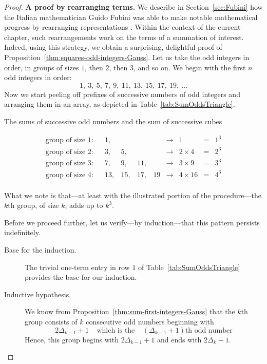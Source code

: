 \begin{proof}
{\bf A proof by rearranging terms.}
%
We describe in Section~\ref{sec:Fubini} how the Italian mathematician
Guido Fubini
%
was able to make notable mathematical progress by rearranging
representations \cite{Fubini}.  Within the context of the current
chapter, such rearrangements work on the terms of a summation of
interest.  Indeed, using this strategy, we obtain a surprising,
delightful proof of Proposition~\ref{thm:squares-odd-integers-Gauss}.
Let us take the odd integers in order, in groups of sizes $1$, then
$2$, then $3$, and so on.  We begin with the first $n$ odd integers in
order:
\[ 1, \ 3, \ 5, \ 7, \ 9, \ 11, \ 13, \ 15, \ 17, \ 19, \ \ldots \]
Now we start peeling off prefixes of successive numbers of odd
integers and arranging them in an array, as depicted in
Table~\ref{tab:SumOddsTriangle}.
\begin{table}[h]
\label{tab:SumOddsTriangle}
\caption{The sums of successive odd numbers and the sum of
  successive cubes}
\[
\begin{array}{llrrrrclcc}
\mbox{group of size 1:} & &
1,  &    &     &     &  \rightarrow & 1           & = & 1^3 \\
\mbox{group of size 2:} & &
3,  &  5, &     &    &  \rightarrow & 2 \times 4  & = & 2^3 \\
\mbox{group of size 3:} & &
7,  &  9, & 11, &    &  \rightarrow & 3 \times 9  & = & 3^3 \\
\mbox{group of size 4:} & &
13, & 15, & 17, & 19 &  \rightarrow & 4 \times 16 & = & 4^3 \\
\end{array}
\]
\end{table}
What we note is that---at least with the illustrated portion of the
procedure---the $k$th group, of size $k$, adds up to $k^3$.

Before we proceed further, let us verify---by induction---that this
pattern persists indefinitely.
\begin{description}
\item[{\small\sf Base for the induction.}]
The trivial one-term entry in row $1$ of Table~\ref{tab:SumOddsTriangle}
provides the base for our induction.

\item[{\small\sf Inductive hypothesis}.]
We know from Proposition~\ref{thm:sum-first-integers-Gauss} that the
$k$th group consists of $k$ consecutive odd numbers beginning with
\[ 2 \Delta_{k-1} +1 \ \ \ \ \
\mbox{which is the} \ \ \ \ \
\left( \Delta_{k-1} +1 \right)\mbox{th odd number}
\]
Hence, this group begins with $2 \Delta_{k-1} +1$ and ends with
$2\Delta_k -1$.


\end{description}
\end{proof}
